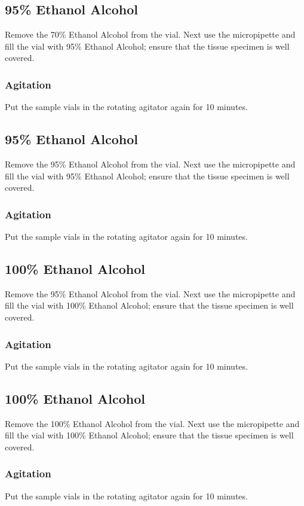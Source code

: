 \subsection{95\% Ethanol Alcohol}
Remove the 70\% Ethanol Alcohol from the vial.  Next use the micropipette and
fill the vial with 95\% Ethanol Alcohol; ensure that the tissue specimen is
well covered.

\subsubsection{Agitation}
Put the sample vials in the rotating agitator again for 10 minutes. 

\subsection{95\% Ethanol Alcohol}
Remove the 95\% Ethanol Alcohol from the vial.  Next use the micropipette and
fill the vial with 95\% Ethanol Alcohol; ensure that the tissue specimen is
well covered.

\subsubsection{Agitation}
Put the sample vials in the rotating agitator again for 10 minutes. 

\subsection{100\% Ethanol Alcohol}
Remove the 95\% Ethanol Alcohol from the vial.  Next use the micropipette and
fill the vial with 100\% Ethanol Alcohol; ensure that the tissue specimen is
well covered.

\subsubsection{Agitation}
Put the sample vials in the rotating agitator again for 10 minutes. 

\subsection{100\% Ethanol Alcohol}
Remove the 100\% Ethanol Alcohol from the vial.  Next use the micropipette and
fill the vial with 100\% Ethanol Alcohol; ensure that the tissue specimen is
well covered.

\subsubsection{Agitation}
Put the sample vials in the rotating agitator again for 10 minutes. 

